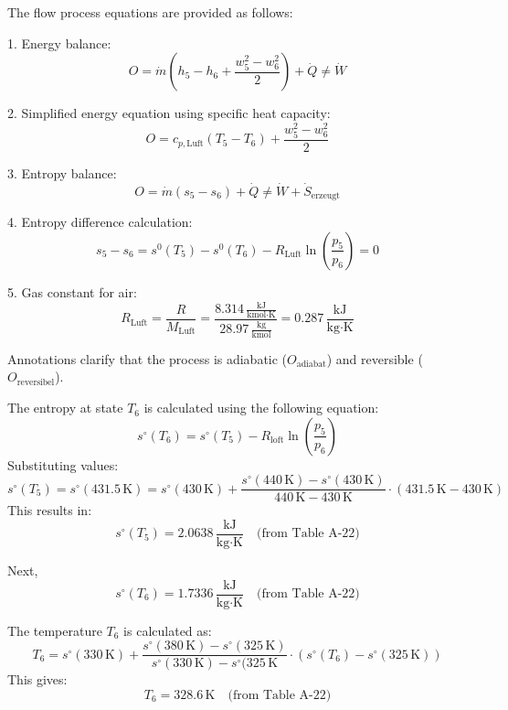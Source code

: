 The flow process equations are provided as follows:  

1. Energy balance:  
\[
O = \dot{m} \left( h_5 - h_6 + \frac{w_5^2 - w_6^2}{2} \right) + \dot{Q} \neq \dot{W}
\]  

2. Simplified energy equation using specific heat capacity:  
\[
O = c_{p,\text{Luft}} \left( T_5 - T_6 \right) + \frac{w_5^2 - w_6^2}{2}
\]  

3. Entropy balance:  
\[
O = \dot{m} \left( s_5 - s_6 \right) + \dot{Q} \neq \dot{W} + \dot{S}_{\text{erzeugt}}
\]  

4. Entropy difference calculation:  
\[
s_5 - s_6 = s^0(T_5) - s^0(T_6) - R_{\text{Luft}} \ln \left( \frac{p_5}{p_6} \right) = 0
\]  

5. Gas constant for air:  
\[
R_{\text{Luft}} = \frac{R}{M_{\text{Luft}}} = \frac{8.314 \, \frac{\text{kJ}}{\text{kmol·K}}}{28.97 \, \frac{\text{kg}}{\text{kmol}}} = 0.287 \, \frac{\text{kJ}}{\text{kg·K}}
\]  

Annotations clarify that the process is adiabatic (\( O_{\text{adiabat}} \)) and reversible (\( O_{\text{reversibel}} \)).

The entropy at state \( T_6 \) is calculated using the following equation:  
\[
s^\circ(T_6) = s^\circ(T_5) - R_{\text{loft}} \ln\left(\frac{p_5}{p_6}\right)
\]  
Substituting values:  
\[
s^\circ(T_5) = s^\circ(431.5 \, \text{K}) = s^\circ(430 \, \text{K}) + \frac{s^\circ(440 \, \text{K}) - s^\circ(430 \, \text{K})}{440 \, \text{K} - 430 \, \text{K}} \cdot (431.5 \, \text{K} - 430 \, \text{K})
\]  
This results in:  
\[
s^\circ(T_5) = 2.0638 \, \frac{\text{kJ}}{\text{kg·K}} \quad \text{(from Table A-22)}
\]  

Next,  
\[
s^\circ(T_6) = 1.7336 \, \frac{\text{kJ}}{\text{kg·K}} \quad \text{(from Table A-22)}
\]  

The temperature \( T_6 \) is calculated as:  
\[
T_6 = s^\circ(330 \, \text{K}) + \frac{s^\circ(380 \, \text{K}) - s^\circ(325 \, \text{K})}{s^\circ(330 \, \text{K}) - s^\circ(325 \, \text{K}} \cdot (s^\circ(T_6) - s^\circ(325 \, \text{K}))
\]  
This gives:  
\[
T_6 = 328.6 \, \text{K} \quad \text{(from Table A-22)}
\]